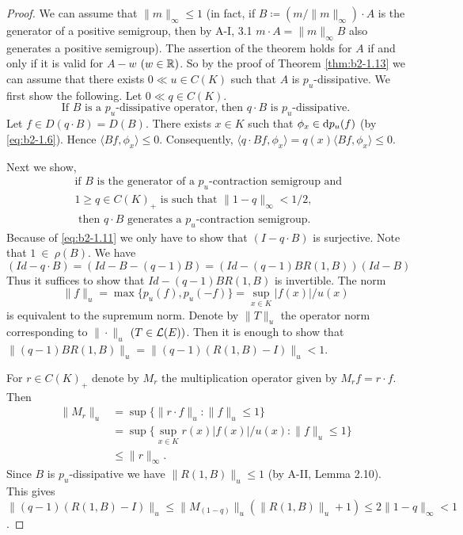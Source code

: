 \begin{proof}
We can assume that $\|m\|_{\infty} \leq 1$ (in fact, if $B \coloneqq (m/\|m\|_{\infty}) \cdot A$ is the generator of a positive semigroup, then by A-I, 3.1 $m \cdot A = \|m\|_{\infty}B$ also generates a positive semigroup).
The assertion of the theorem holds for $A$ if and only if it is valid for $A - w$ $(w \in \mathbb{R})$.
So by the proof of Theorem \ref{thm:b2-1.13} we can assume that there exists $0 \ll u \in C(K)$ such that $A$ is $p_{u}$-dissipative.
We first show the following. Let $0 \ll q \in C(K)$.
\begin{equation}\label{eq:b2-1.11}
\text{If } B \text{ is a } p_{u}\text{-dissipative operator, then } q \cdot B \text{ is } p_{u}\text{-dissipative.}
\end{equation}
Let $f \in D(q \cdot B) = D(B)$.
There exists $x \in K$ such that $\phi_{x} \in \mathop{}\!\mathrm{d}{p}_{u}(f)$ (by \eqref{eq:b2-1.6}). 
Hence $\langle Bf,\phi_{x} \rangle \leq 0$.
Consequently, $\langle q \cdot Bf,\phi_{x} \rangle = q(x)\langle Bf,\phi_{x} \rangle \leq 0$.

Next we show,
\begin{equation}  \label{eq:b2-1.12}
\begin{aligned}
&\text{if } B \text{ is the generator of a } p_{u}\text{-contraction semigroup and } \\
&1 \geq q \in C(K)_{+} \text{ is such that } \|1 - q\|_{\infty} < 1/2,  \\
&\text{ then } q \cdot B \text{ generates a } p_{u}\text{-contraction semigroup.}
\end{aligned}
\end{equation}
Because of \eqref{eq:b2-1.11} we only have to show that $(I - q \cdot B)$ is surjective. 
Note that $1~\in~\rho(B)$.
We have 
\[(Id - q \cdot B) = (Id - B - (q-1)B) = (Id - (q-1)BR(1,B))(Id - B)
\]
Thus it suffices to show that $Id - (q-1)BR(1,B)$ is invertible.
The norm 
\[
\|f\|_{u} = \max\{p_{u}(f), p_{u}(-f)\} = \sup_{x \in K} |f(x)|/u(x)
\]
is equivalent to the supremum norm.
Denote by $\|T\|_{u}$ the operator norm corresponding to $\|\cdot\|_{u}$ $(T \in \mathcal{L}(E))$.
Then it is enough to show that $\|(q-1)BR(1,B)\|_{u} = \|(q-1)(R(1,B) - I)\|_{u} < 1$.

For $r \in C(K)_{+}$ denote by $M_{r}$ the multiplication operator given by $M_{r}f = r \cdot f$.
Then 
\begin{align*}
	    \|M_{r}\|_{u} &= \sup\{\|r \cdot f\|_{u} : \|f\|_{u} \leq 1\} \\
	              &= \sup\{\sup_{x \in K} r(x)|f(x)|/u(x) : \|f\|_{u} \leq 1\}  \\
	              &\leq \|r\|_{\infty}.
\end{align*}
Since $B$ is $p_{u}$-dissipative we have $\|R(1,B)\|_{u} \leq 1$ (by A-II, Lemma 2.10).
This gives $\|(q-1)(R(1,B) - I)\|_{u} \leq \|M_{(1-q)}\|_{u}(\|R(1,B)\|_{u} + 1) \leq 2\|1 - q\|_{\infty} < 1$.


\end{proof}
